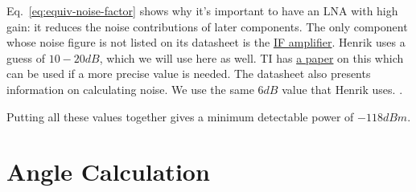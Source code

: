Eq.~\ref{eq:equiv-noise-factor} shows why it's important to have an LNA with high gain: it reduces
the noise contributions of later components. The only component whose noise figure is not listed on
its datasheet is the \hyperref[sec:ada4940-2]{IF amplifier}. Henrik uses a guess of
$10 - 20 \si{dB}$, which we will use here as well. TI has
\href{http://www.ti.com/lit/an/slyt094/slyt094.pdf}{a paper} on this which can be used if a more
precise value is needed. The datasheet also presents information on calculating noise. We use the
same $6 \si{dB}$ value that Henrik uses. .

Putting all these values together gives a minimum detectable power of $-118 \si{dBm}$.

\section{Angle Calculation}
\label{sec:angle}


